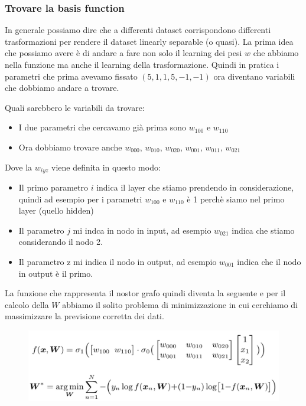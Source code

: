 \documentclass[14pt]{extreport}
\begin{document}
\subsubsection{Trovare la basis function}

In generale possiamo dire che a differenti dataset corrispondono differenti trasformazioni per rendere il dataset linearly separable (o quasi). La
prima idea che possiamo avere è di andare a fare non solo il learning dei pesi $w$ che abbiamo nella funzione ma anche il learning della
trasformazione. Quindi in pratica i parametri che prima avevamo fissato $(5,1,1,5,-1,-1)$ ora diventano variabili che dobbiamo andare a trovare.

Quali sarebbero le variabili da trovare:
\begin{itemize}
\item I due parametri che cercavamo già prima sono $w_{100}$ e $w_{110}$ 
\item Ora dobbiamo trovare anche $w_{000}$, $w_{010}$, $w_{020}$, $w_{001}$, $w_{011}$, $w_{021}$
\end{itemize}

Dove la $w_{iyz}$ viene definita in questo modo:
\begin{itemize}
\item Il primo parametro $i$ indica il layer che stiamo prendendo in considerazione, quindi ad esempio per i parametri $w_{100}$ e $w_{110}$ è 1
perchè siamo nel primo layer (quello hidden)
\item Il parametro $j$ mi indca in nodo in input, ad esempio $w_{021}$ indica che stiamo considerando il nodo 2.
\item Il parametro z mi indica il nodo in output, ad esempio $w_{001}$ indica che il nodo in output è il primo. 
\end{itemize}

La funzione che rappresenta il nostor grafo quindi diventa la seguente e per il calcolo della $W$ abbiamo il solito problema di minimizzazione in cui
cerchiamo di massimizzare la previsione corretta dei dati.

\begin{figure}[H]
\centering
\includegraphics[width=0.9\linewidth]{366.jpeg}
\end{figure}
\end{document}
